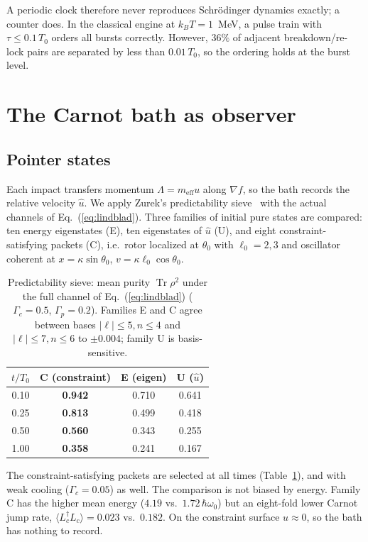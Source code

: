 \documentclass[aps,prc,twocolumn,superscriptaddress,amsmath,amssymb,nofootinbib]{revtex4-2}
\newcommand{\Tr}{\operatorname{Tr}}
\begin{document}
A periodic clock therefore never reproduces Schr\"odinger dynamics exactly; a counter does. In the classical engine at $k_BT=1$~MeV, a pulse train with $\tau\le0.1\,T_0$ orders all bursts correctly. However, $36\%$ of adjacent breakdown/re-lock pairs are separated by less than $0.01\,T_0$, so the ordering holds at the burst level.

\section{The Carnot bath as observer}
\label{sec:observer}
\subsection{Pointer states}
Each impact transfers momentum $\Lambda=m_{\text{eff}}u$ along $\nabla f$, so the bath records the relative velocity $\hat u$. We apply Zurek's predictability sieve~\cite{Zurek2003,PazZurek1999} with the actual channels of Eq.~(\ref{eq:lindblad}). Three families of initial pure states are compared: ten energy eigenstates (E), ten eigenstates of $\hat u$ (U), and eight constraint-satisfying packets (C), i.e.\ rotor localized at $\theta_0$ with $\ell_0=2,3$ and oscillator coherent at $x=\kappa\sin\theta_0$, $v=\kappa\ell_0\cos\theta_0$.

\begin{table}[t]
\caption{Predictability sieve: mean purity $\Tr\rho^2$ under the full channel of Eq.~(\ref{eq:lindblad}) ($\Gamma_c=0.5$, $\Gamma_p=0.2$). Families E and C agree between bases $|\ell|\le5,n\le4$ and $|\ell|\le7,n\le6$ to $\pm0.004$; family U is basis-sensitive.}
\label{tab:sieve}
\begin{ruledtabular}
\begin{tabular}{cccc}
$t/T_0$ & C (constraint) & E (eigen) & U ($\hat u$) \\
\hline
0.10 & \textbf{0.942} & 0.710 & 0.641 \\
0.25 & \textbf{0.813} & 0.499 & 0.418 \\
0.50 & \textbf{0.560} & 0.343 & 0.255 \\
1.00 & \textbf{0.358} & 0.241 & 0.167 \\
\end{tabular}
\end{ruledtabular}
\end{table}

The constraint-satisfying packets are selected at all times (Table~\ref{tab:sieve}), and with weak cooling ($\Gamma_c=0.05$) as well. The comparison is not biased by energy. Family C has the higher mean energy ($4.19$ vs.\ $1.72\,\hbar\omega_0$) but an eight-fold lower Carnot jump rate, $\langle L_c^\dagger L_c\rangle=0.023$ vs.\ $0.182$. On the constraint surface $u\approx0$, so the bath has nothing to record.
\end{document}
